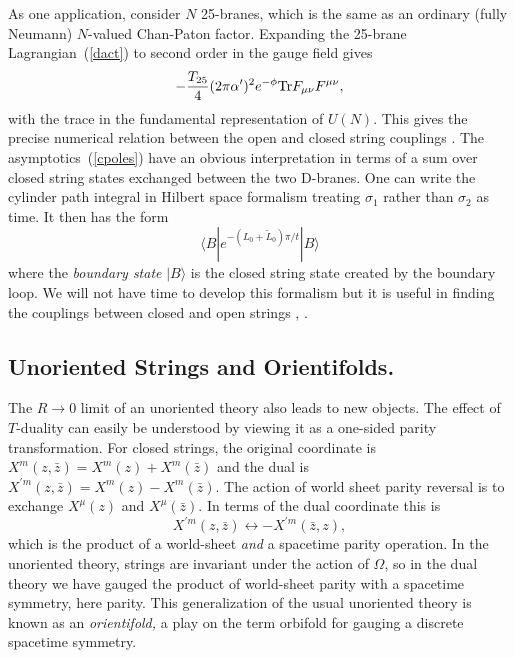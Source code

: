 \documentclass[12pt]{article}
\def\be{\begin{equation}}
\def\ee{\end{equation}}
\def\ap{\alpha'}
\def\Tr{{\rm Tr}}
\newcommand{\zb}{{\bar{z}}}
\begin{document}
As one application, consider $N$ 25-branes, which is the same as an ordinary
(fully Neumann)
$N$-valued Chan-Paton factor.  Expanding the 25-brane
Lagrangian~(\ref{dact}) to second order in the gauge field gives
\be
- {T_{25} \over 4} (2\pi\ap)^2 e^{-\phi}\Tr F_{\mu\nu}F^{\mu\nu},
\ee
with the trace in the fundamental representation of $U(N)$.  This gives the
precise numerical relation between the open and closed string
couplings \cite{occoup} . The asymptotics~(\ref{cpoles}) have an obvious interpretation in
terms of a sum over closed string states exchanged between the two D-branes.
One can write the cylinder path integral in Hilbert space formalism
treating
$\sigma_1$ rather than $\sigma_2$ as time.  It then has the form
\be
\langle B | e^{-(L_0 + \tilde L_0)\pi/t} | B \rangle
\ee
where the {\it
boundary state} $|B\rangle$ is the closed string state created by the
boundary loop.  We will not have time to develop
this formalism but it is useful in finding the couplings between
closed and open strings \cite{chans}, \cite{rrex}.

\subsection{Unoriented Strings and Orientifolds.}

The $R \to 0$ limit of an unoriented theory also leads to new objects.
The effect of $T$-duality can easily be understood by viewing it as a
one-sided parity transformation.
For closed strings, the original coordinate is
$X^m(z,\zb)=X^m(z)+X^m(\zb)$ and the dual is $X^{\prime
m}(z,\zb)=X^m(z)-X^m(\zb)$.  The action of world sheet parity reversal is
to exchange $X^\mu(z)$ and $X^\mu(\zb)$. In terms of the dual coordinate
this is
\be
X^{\prime m}(z,\zb) \leftrightarrow -X^{\prime m}(\zb,z),
\ee
which is the product of a world-sheet {\it and} a spacetime parity operation.
In the unoriented theory, strings are invariant under the action of
$\Omega$, so in the dual theory we have gauged the product of world-sheet
parity with a spacetime symmetry, here parity.  This generalization of the
usual unoriented theory is known as an {\it orientifold,} a play on the term
orbifold for gauging a discrete spacetime symmetry.
\end{document}
